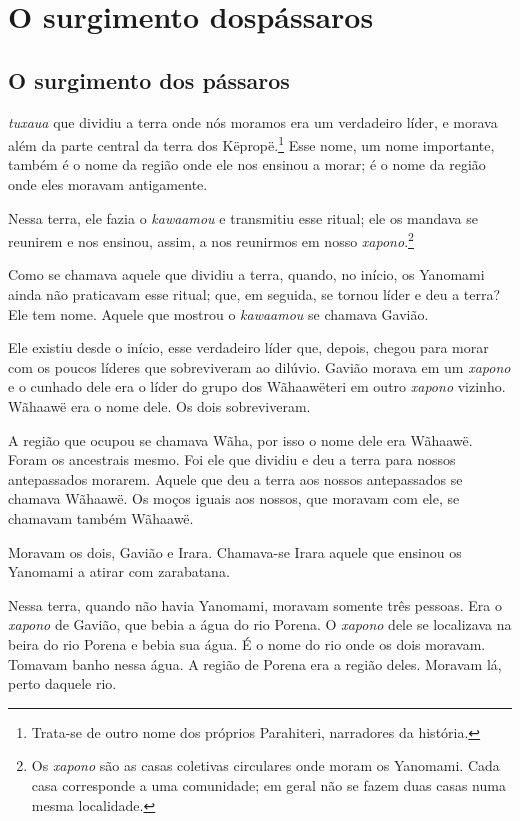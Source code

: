 \part[O surgimento dos pássaros]{O surgimento dos\break pássaros}

\chapter{O surgimento dos pássaros}
 
 \textit{tuxaua} que dividiu a terra onde nós moramos era um verdadeiro
líder, e morava além da parte central da terra dos
Këpropë.\footnote{Trata-se de outro nome dos próprios Parahiteri, narradores da história.} Esse nome, um nome importante, também é o nome
da região onde ele nos ensinou a morar; é o nome da região onde eles
moravam antigamente.

Nessa terra, ele fazia o \textit{kawaamou} e transmitiu esse ritual; ele os
mandava se reunirem e nos ensinou, assim, a nos
reunirmos em nosso \textit{xapono}.\footnote{Os \textit{xapono} são as casas coletivas circulares onde moram os Yanomami. Cada casa corresponde a uma comunidade; em geral não se fazem duas casas numa mesma localidade.} 

Como se chamava aquele que dividiu a terra, quando, no início, os
Yanomami ainda não praticavam esse ritual; que, em seguida, se tornou
líder e deu a terra? Ele tem nome. Aquele que mostrou
o \textit{kawaamou} se chamava Gavião.

Ele existiu desde o início, esse verdadeiro líder que, depois, chegou
para morar com os poucos líderes que sobreviveram ao dilúvio. Gavião
morava em um \textit{xapono} e o cunhado dele era o líder do grupo dos
Wãhaawëteri em outro \textit{xapono} vizinho. Wãhaawë era o nome
dele. Os dois sobreviveram.

A região que ocupou se chamava Wãha, por isso o nome dele era
Wãhaawë. Foram os ancestrais mesmo. Foi ele que dividiu e deu a terra
para nossos antepassados morarem. Aquele que deu a terra aos nossos
antepassados se chamava Wãhaawë. Os moços iguais aos nossos, que moravam
com ele, se chamavam também Wãhaawë. 

Moravam os dois, Gavião e Irara. Chamava-se Irara aquele que ensinou os
Yanomami a atirar com zarabatana.

Nessa terra, quando não havia Yanomami, moravam somente três pessoas.
Era o \textit{xapono} de Gavião, que bebia a água do rio Porena. O \textit{xapono} dele se
localizava na beira do rio Porena e bebia sua água. É o nome do rio onde
os dois moravam. Tomavam banho nessa água. A região de Porena era a região
deles. Moravam lá, perto daquele rio. 

